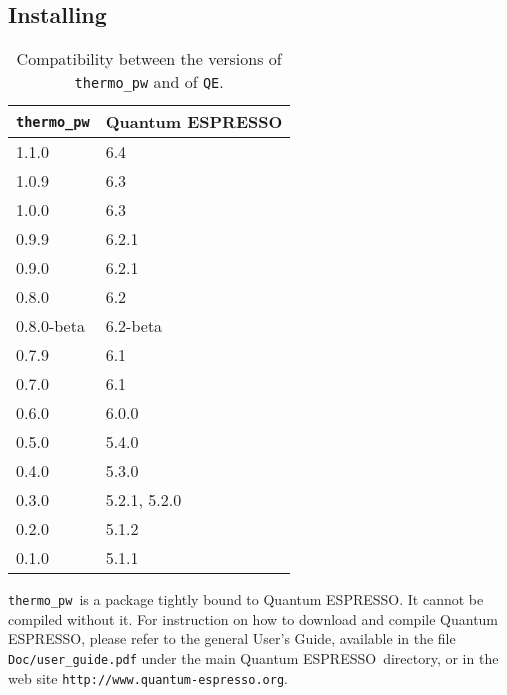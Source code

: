 \documentclass[12pt,a4paper]{article}
\def\qe{{\sc Quantum ESPRESSO}}
\def\thermo{\texttt{thermo\_pw}}
\begin{document}
\subsection{\color{web-blue}Installing}
\begin{table}
\begin{center}
\begin{tabular}{ll}
\hline
\hline
\texttt{thermo\_pw} & \qe  \\
\hline
1.1.0 & 6.4 \\
1.0.9 & 6.3 \\
1.0.0 & 6.3 \\
0.9.9 & 6.2.1 \\
0.9.0 & 6.2.1 \\
0.8.0 & 6.2 \\
0.8.0-beta & 6.2-beta \\
0.7.9 & 6.1 \\
0.7.0 & 6.1 \\
0.6.0 & 6.0.0 \\
0.5.0 & 5.4.0 \\
0.4.0 & 5.3.0 \\
0.3.0 & 5.2.1, 5.2.0 \\
0.2.0 & 5.1.2 \\
0.1.0 & 5.1.1 \\
\hline
\hline
\end{tabular}
\caption{Compatibility between the versions of 
\texttt{thermo\_pw} and of \texttt{QE}.}
\end{center}
\end{table}

\thermo\ is a package tightly bound to \qe. It cannot be compiled without
it. For instruction on how to download and compile \qe, please 
refer to the general User's Guide, available in the file \texttt{Doc/user\_guide.pdf}
under the main \qe\ directory, or in the web site 
\texttt{http://www.quantum-espresso.org}.
\end{document}
